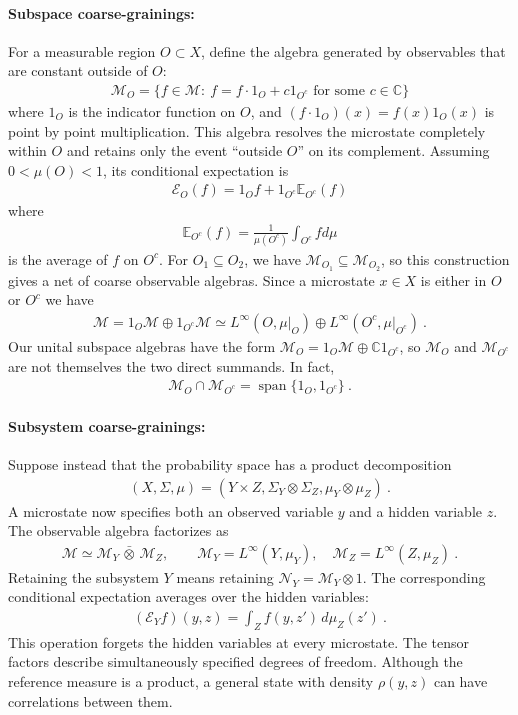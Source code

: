 \documentclass[a4paper,11pt]{article}
\theoremstyle{definition}
\newcommand{\mN}{\mathcal{N}}
\newcommand{\mM}{\mathcal{M}}
\newcommand{\mE}{\mathcal{E}}
\begin{document}
\paragraph{Subspace coarse-grainings:}
For a measurable region $O\subset X$, define the algebra generated by observables that are constant outside of $O$:
\begin{align}
    \mM_O=\{f\in\mM:\ f=f \cdot 1_O +c 1_{O^c}\text{ for some }c\in\mathbb C\}
\end{align}
where $1_O$ is the indicator function on $O$, and $(f\cdot 1_O)(x)=f(x)1_O(x)$ is point by point multiplication.
This algebra resolves the microstate completely within $O$ and retains only the event ``outside $O$'' on its complement. Assuming $0<\mu(O)<1$, its conditional expectation is
\begin{align}
    \mE_O(f)=1_O f+
    1_{O^c}\mathbb{E}_{O^c}(f)
\end{align}
where
\begin{align}
    \mathbb{E}_{O^c}(f)=\frac{1}{\mu(O^c)}\int_{O^c} f d\mu
\end{align}
is the average of $f$ on $O^c$.
For $O_1\subseteq O_2$, we have $\mM_{O_1}\subseteq\mM_{O_2}$, so this construction gives a net of coarse observable algebras. Since a microstate $x\in X$ is either in $O$ or $O^c$ we have
\begin{align}
    \mM=1_O\mM\oplus 1_{O^c}\mM
    \simeq L^\infty(O,\mu|_O)\oplus L^\infty(O^c,\mu|_{O^c})\ .
\end{align}
Our unital subspace algebras have the form $\mM_O=1_O\mM\oplus\mathbb C1_{O^c}$, so $\mM_O$ and $\mM_{O^c}$ are not themselves the two direct summands. In fact,
\begin{align}
    \mM_O\cap\mM_{O^c}=\operatorname{span}\{1_O,1_{O^c}\}\ .
\end{align}

\paragraph{Subsystem coarse-grainings:}
Suppose instead that the probability space has a product decomposition
\begin{align}
    (X,\Sigma,\mu)=(Y\times Z,\Sigma_Y\otimes\Sigma_Z,\mu_Y\otimes\mu_Z)\ .
\end{align}
A microstate now specifies both an observed variable $y$ and a hidden variable $z$. The observable algebra factorizes as
\begin{align}
    \mM\simeq\mM_Y\,\bar\otimes\,\mM_Z,
    \qquad \mM_Y=L^\infty(Y,\mu_Y),\quad
    \mM_Z=L^\infty(Z,\mu_Z)\ .
\end{align}
Retaining the subsystem $Y$ means retaining $\mN_Y=\mM_Y\otimes 1$. The corresponding conditional expectation averages over the hidden variables:
\begin{align}
    (\mE_Y f)(y,z)=\int_Z f(y,z')\,d\mu_Z(z')\ .
\end{align}
This operation forgets the hidden variables at every microstate. The tensor factors describe simultaneously specified degrees of freedom. Although the reference measure is a product, a general state with density $\rho(y,z)$ can have correlations between them.
\end{document}

